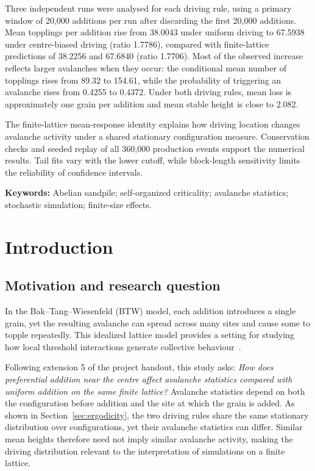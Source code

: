 \documentclass[11pt,a4paper,oneside]{report}
\numberwithin{equation}{chapter}
\begin{document}
Three independent runs were analysed for each driving rule, using a primary window of 20,000 additions per run after discarding the first 20,000 additions. Mean topplings per addition rise from 38.0043 under uniform driving to 67.5938 under centre-biased driving (ratio 1.7786), compared with finite-lattice predictions of 38.2256 and 67.6840 (ratio 1.7706). Most of the observed increase reflects larger avalanches when they occur: the conditional mean number of topplings rises from 89.32 to 154.61, while the probability of triggering an avalanche rises from 0.4255 to 0.4372. Under both driving rules, mean loss is approximately one grain per addition and mean stable height is close to 2.082.

The finite-lattice mean-response identity explains how driving location changes avalanche activity under a shared stationary configuration measure. Conservation checks and seeded replay of all 360,000 production events support the numerical results. Tail fits vary with the lower cutoff, while block-length sensitivity limits the reliability of confidence intervals.

\medskip
\noindent\textbf{Keywords:} Abelian sandpile; self-organized criticality; avalanche statistics; stochastic simulation; finite-size effects.

\clearpage
\begingroup
\small
\setlength{\parskip}{0pt}
\tableofcontents
\endgroup
\clearpage
{}

\chapter{Introduction}
\label{ch:introduction}
\section{Motivation and research question}
\label{sec:motivation}
In the Bak--Tang--Wiesenfeld (BTW) model, each addition introduces a single grain, yet the resulting avalanche can spread across many sites and cause some to topple repeatedly. This idealized lattice model provides a setting for studying how local threshold interactions generate collective behaviour~\cite{bak1987,bak1988}.

Following extension 5 of the project handout, this study asks: \emph{How does preferential addition near the centre affect avalanche statistics compared with uniform addition on the same finite lattice?} Avalanche statistics depend on both the configuration before addition and the site at which the grain is added. As shown in Section~\ref{sec:ergodicity}, the two driving rules share the same stationary distribution over configurations, yet their avalanche statistics can differ. Similar mean heights therefore need not imply similar avalanche activity, making the driving distribution relevant to the interpretation of simulations on a finite lattice.
\end{document}
